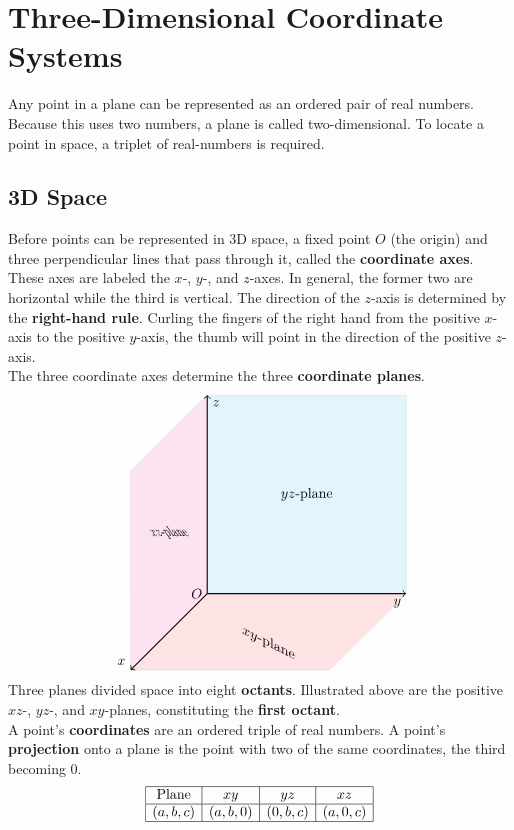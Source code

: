 \documentclass[../Calculus_\Roman{3}]{subfiles}
\begin{document}
	\section{Three-Dimensional Coordinate Systems}
		Any point in a plane can be represented as an ordered pair of real numbers. Because this uses two numbers, a plane is called two-dimensional. To locate a point in space, a triplet of real-numbers is required.
		\subsection*{3D Space}
			Before points can be represented in 3D space, a fixed point $O$ (the origin) and three perpendicular lines that pass through it, called the \textbf{coordinate axes}. These axes are labeled the $x$-, $y$-, and $z$-axes. In general, the former two are horizontal while the third is vertical. The direction of the $z$-axis is determined by the \textbf{right-hand rule}. Curling the fingers of the right hand from the positive $x$-axis to the positive $y$-axis, the thumb will point in the direction of the positive $z$-axis. \\
			The three coordinate axes determine the three \textbf{coordinate planes}.
			\[\begin{tikzpicture}[xscale = 5, yscale = 5]
				\coordinate (O) at (0, 0, 0) node[anchor = east]{$O$};
				\draw[thick, ->] (0, 0, 0) -- (1, 0, 0) node[anchor = north east]{$y$};
				\draw[thick, ->] (0, 0, 0) -- (0, 1, 0) node[anchor = north west]{$z$};
				\draw[thick, ->] (0, 0, 0) -- (0, 0, 1) node[anchor = south east]{$x$};
				\draw[fill = cyan, opacity = 0.1] (0, 0, 0) -- (1, 0, 0) -- (1, 1, 0) -- (0, 1, 0);
					\node at (0.5, 0.5, 0) {$yz$-plane};
				\draw[fill = magenta, opacity = 0.1] (0, 0, 0) -- (0, 1, 0) -- (0, 1, 1) -- (0, 0, 1);
					\node[xslant = -0.7, xscale = 0.7] at (0, 0.5, 0.5) {$xz$-plane};
				\draw[fill = red, opacity = 0.1] (0, 0, 0) -- (0, 0, 1) -- (1, 0, 1) -- (1, 0, 0);
					\node[below, yslant = -0.5] at (0.5, 0, 0.5) {$xy$-plane};
			\end{tikzpicture}\]
			Three planes divided space into eight \textbf{octants}. Illustrated above are the positive $xz$-, $yz$-, and $xy$-planes, constituting the \textbf{first octant}. \\
			A point's \textbf{coordinates} are an ordered triple of real numbers. A point's \textbf{projection} onto a plane is the point with two of the same coordinates, the third becoming 0.
			\[\begin{array}{|c|c|c|c|}\hline
				\text{Plane} & xy & yz & xz \\\hline
				(a, b, c) & (a, b, 0) & (0, b, c) & (a, 0, c) \\\hline
			\end{array}\]
\end{document}
